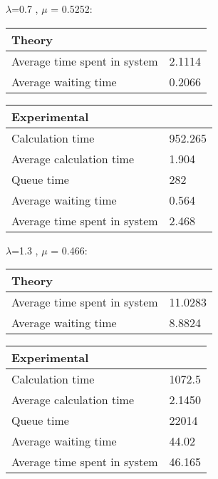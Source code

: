 \begin{minipage}{\linewidth}
   $\lambda$=0.7 , $\mu$ = 0.5252:

    \bigskip
    \begin{minipage}{0.45\linewidth}
        \begin{tabular}{|l|l|}
            \hline
            Theory & \\
            \hline
            Average time spent in system & 2.1114 \\
            Average waiting time & 0.2066 \\
            \hline
        \end{tabular}
    \end{minipage}
    \begin{minipage}{0.45\linewidth}
        \begin{tabular}{|l|l|}
            \hline
            Experimental & \\
            \hline
            Calculation time & 952.265 \\
            Average calculation time & 1.904 \\
            Queue time & 282 \\
            Average waiting time & 0.564 \\
            Average time spent in system & 2.468 \\
            \hline
        \end{tabular}
    \end{minipage}
    \bigskip
\end{minipage}

\begin{minipage}{\linewidth}
   $\lambda$=1.3 , $\mu$ = 0.466:

    \bigskip
    \begin{minipage}{0.45\linewidth}
        \begin{tabular}{|l|l|}
            \hline
            Theory & \\
            \hline
            Average time spent in system & 11.0283 \\
            Average waiting time & 8.8824 \\
            \hline
        \end{tabular}
    \end{minipage}
    \begin{minipage}{0.45\linewidth}
        \begin{tabular}{|l|l|}
            \hline
            Experimental & \\
            \hline
            Calculation time & 1072.5 \\
            Average calculation time & 2.1450 \\
            Queue time & 22014 \\
            Average waiting time & 44.02 \\
            Average time spent in system & 46.165 \\
            \hline
        \end{tabular}
    \end{minipage}
    \bigskip
\end{minipage}

